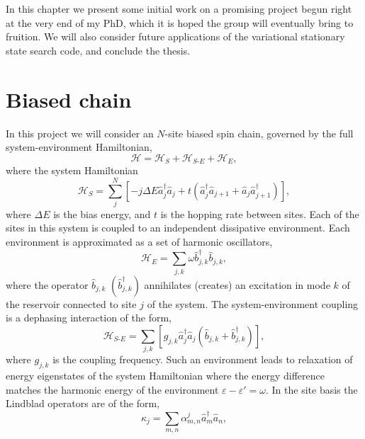 In this chapter we present some initial work on a promising project begun right at the very end of my PhD, which it is hoped the group will eventually bring to fruition. We will also consider future applications of the variational stationary state search code, and conclude the thesis.

\section{Biased chain}
In this project we will consider an \(N\)-site biased spin chain, governed by the full system-environment Hamiltonian,
\begin{equation}
	\mathcal{H} = \mathcal{H}_{S} + \mathcal{H}_{S\text{-}E} + \mathcal{H}_{E},
	\label{eq:fw1-0}
\end{equation}
where the system Hamiltonian
\begin{equation}
	\mathcal{H}_{S} = \sum_{j}^{N}\left[ -j \Delta E \hat{a}_{j}^{\dagger}\hat{a}_{j} + t\left( \hat{a}_{j}^{\dagger}\hat{a}_{j+1} + \hat{a}_{j}\hat{a}_{j+1}^{\dagger}\right)\right],
	\label{eq:fw1-1}
\end{equation}
where \(\Delta E\) is the bias energy, and \(t\) is the hopping rate between sites. Each of the sites in this system is coupled to an independent dissipative environment. Each environment is approximated as a set of harmonic oscillators,
\begin{equation}
	\mathcal{H}_{E} = \sum_{j,k} \omega\hat{b}_{j,k}^{\dagger}\hat{b}_{j,k},
	\label{eq:fw1-3}
\end{equation}
where the operator \(\hat{b}_{j,k}\) \((\hat{b}_{j,k}^{\dagger})\) annihilates (creates) an excitation in mode \(k\) of the reservoir connected to site \(j\) of the system. The system-environment coupling is a dephasing interaction of the form,
\begin{equation}
	\mathcal{H}_{S\text{-}E} = \sum_{j,k} \left[ g_{j,k}\hat{a}_{j}^{\dagger}\hat{a}_{j}\left( \hat{b}_{j,k} + \hat{b}_{j,k}^{\dagger} \right)\right],
	\label{eq:fw1-4}
\end{equation}
where \(g_{j,k}\) is the coupling frequency. Such an environment leads to relaxation of energy eigenstates of the system Hamiltonian where the energy difference matches the harmonic energy of the environment \(\varepsilon - \varepsilon' = \omega\). In the site basis the Lindblad operators are of the form,
\begin{equation}
	\kappa_{j} = \sum_{m,n} \alpha_{m,n}^{j} \hat{a}_{m}^{\dagger}\hat{a}_{n},
	\label{eq:fw1-5}
\end{equation}
